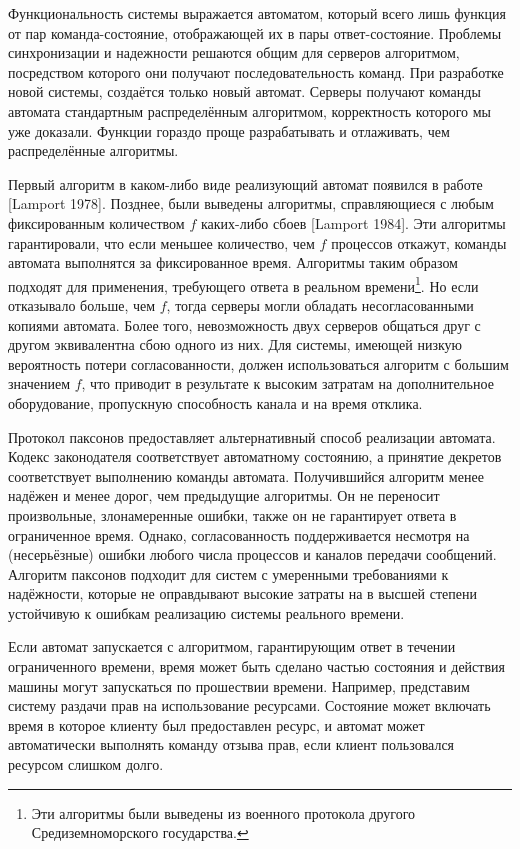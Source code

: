 \documentclass[12pt, a4paper]{article} %
\begin{document}
Функциональность системы выражается автоматом, который всего лишь функция от пар команда-состояние, отображающей их в пары ответ-состояние. Проблемы синхронизации и надежности решаются общим для серверов алгоритмом, посредством которого они получают последовательность команд. При разработке новой системы, создаётся только новый автомат. Серверы получают команды автомата стандартным распределённым алгоритмом, корректность которого мы уже доказали. Функции гораздо проще разрабатывать и отлаживать, чем распределённые алгоритмы.

Первый алгоритм в каком-либо виде реализующий автомат появился в работе [Lamport 1978]. Позднее, были выведены алгоритмы, справляющиеся с любым фиксированным количеством $f$ каких-либо сбоев [Lamport 1984]. Эти алгоритмы гарантировали, что если меньшее количество, чем $f$ процессов откажут, команды автомата выполнятся за фиксированное время. Алгоритмы таким образом подходят для применения, требующего ответа в реальном времени\footnote{Эти алгоритмы были выведены из военного протокола другого Средиземноморского государства.}. Но если отказывало больше, чем $f$, тогда серверы могли обладать несогласованными копиями автомата. Более того, невозможность двух серверов общаться друг с другом эквивалентна сбою одного из них. Для системы, имеющей низкую вероятность потери согласованности, должен использоваться алгоритм с большим значением $f$, что приводит в результате к высоким затратам на дополнительное оборудование, пропускную способность канала и на время отклика.

Протокол паксонов предоставляет альтернативный способ реализации автомата. Кодекс законодателя соответствует автоматному состоянию, а принятие декретов соответствует выполнению команды автомата. Получившийся алгоритм менее надёжен и менее дорог, чем предыдущие алгоритмы. Он не переносит произвольные, злонамеренные ошибки, также он не гарантирует ответа в ограниченное время. Однако, согласованность поддерживается несмотря на (несерьёзные) ошибки любого числа процессов и каналов передачи сообщений. Алгоритм паксонов подходит для систем с умеренными требованиями к надёжности, которые не оправдывают высокие затраты на в высшей степени устойчивую к ошибкам реализацию системы реального времени.

Если автомат запускается с алгоритмом, гарантирующим ответ в течении ограниченного времени, время может быть сделано частью состояния и действия машины могут запускаться по прошествии времени. Например, представим систему раздачи прав на использование ресурсами. Состояние может включать время в которое клиенту был предоставлен ресурс, и автомат может автоматически выполнять команду отзыва прав, если клиент пользовался ресурсом слишком долго.
\end{document}
